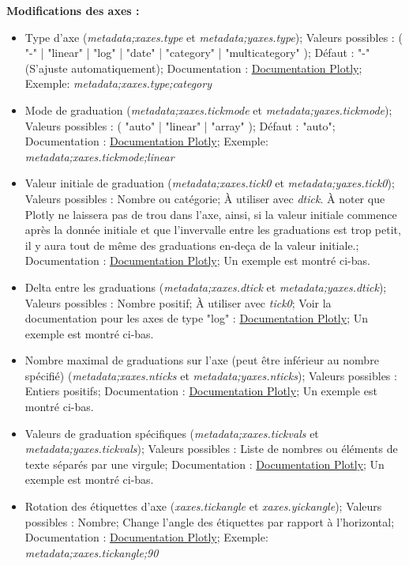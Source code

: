 \documentclass[11pt]{article}
\begin{document}
\textbf{Modifications des axes :}
\begin{itemize}
    \item Type d'axe (\textit{metadata;xaxes.type} et \textit{metadata;yaxes.type}); Valeurs possibles : ( "-" | "linear" | "log" | "date" | "category" | "multicategory" ); Défaut : "-" (S'ajuste automatiquement); Documentation : \href{https://plotly.com/python/reference/layout/xaxis/#layout-xaxis-type}{Documentation Plotly}; Exemple: \textit{metadata;xaxes.type;category}
    \item Mode de graduation (\textit{metadata;xaxes.tickmode} et \textit{metadata;yaxes.tickmode}); Valeurs possibles : ( "auto" | "linear" | "array" ); Défaut : "auto"; Documentation : \href{https://plotly.com/python/reference/layout/xaxis/#layout-xaxis-minor-tickmode}{Documentation Plotly}; Exemple: \textit{metadata;xaxes.tickmode;linear}
    \item Valeur initiale de graduation (\textit{metadata;xaxes.tick0} et \textit{metadata;yaxes.tick0}); Valeurs possibles : Nombre ou catégorie; À utiliser avec \textit{dtick}. À noter que Plotly ne laissera pas de trou dans l'axe, ainsi, si la valeur initiale commence après la donnée initiale et que l'invervalle entre les graduations est trop petit, il y aura tout de même des graduations en-deça de la valeur initiale.; Documentation : \href{https://plotly.com/python/reference/layout/xaxis/#layout-xaxis-tick0}{Documentation Plotly}; Un exemple est montré ci-bas.
    \item Delta entre les graduations (\textit{metadata;xaxes.dtick} et \textit{metadata;yaxes.dtick}); Valeurs possibles : Nombre positif; À utiliser avec \textit{tick0}; Voir la documentation pour les axes de type "log" : \href{https://plotly.com/python/reference/layout/xaxis/#layout-xaxis-dtick}{Documentation Plotly}; Un exemple est montré ci-bas.
    \item Nombre maximal de graduations sur l'axe (peut être inférieur au nombre spécifié) (\textit{metadata;xaxes.nticks} et \textit{metadata;yaxes.nticks}); Valeurs possibles : Entiers positifs; Documentation : \href{https://plotly.com/python/reference/layout/xaxis/#layout-xaxis-minor-nticks}{Documentation Plotly}; Un exemple est montré ci-bas.
    \item Valeurs de graduation spécifiques (\textit{metadata;xaxes.tickvals} et \textit{metadata;yaxes.tickvals}); Valeurs possibles : Liste de nombres ou éléments de texte séparés par une virgule; Documentation : \href{https://plotly.com/python/reference/layout/xaxis/#layout-xaxis-minor-tickvals}{Documentation Plotly}; Un exemple est montré ci-bas.
    \item Rotation des étiquettes d'axe (\textit{xaxes.tickangle} et \textit{xaxes.yickangle}); Valeurs possibles : Nombre; Change l'angle des étiquettes par rapport à l'horizontal; Documentation : \href{https://plotly.com/python/reference/layout/xaxis/#layout-xaxis-tickangle}{Documentation Plotly}; Exemple: \textit{metadata;xaxes.tickangle;90}
\end{itemize}
\end{document}
